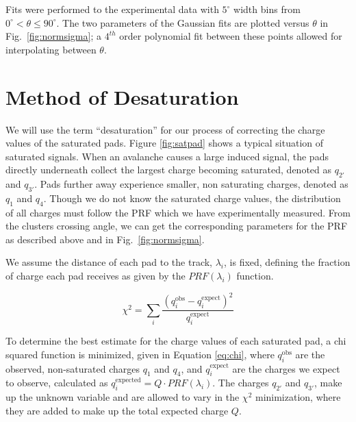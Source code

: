 \documentclass[review]{elsarticle}
\begin{document}
Fits were performed to the experimental data with  $5^{\circ}$ width bins from $0^{\circ} < \theta \leq 90^{\circ}$. The two parameters of the Gaussian fits are plotted versus $\theta$ in Fig.~\ref{fig:normsigma}; a $4^{th}$ order polynomial fit between these points allowed for interpolating between $\theta$.

\section{Method of Desaturation}
We will use the term ``desaturation'' for our process of correcting the charge values of the saturated pads. Figure \ref{fig:satpad} shows a typical situation of saturated signals. When an avalanche causes a large induced signal, the pads directly underneath collect the largest charge becoming saturated, denoted as $q_{2'}$ and $q_{3'}$. Pads further away experience smaller, non saturating charges, denoted as $q_{1}$ and $q_{4}$. Though we do not know the saturated charge values, the distribution of all charges must follow the PRF which we have experimentally measured. From the clusters crossing angle, we can get the corresponding parameters for the PRF as described above and in Fig.~\ref{fig:normsigma}.

We assume the distance of each pad to the track, $\lambda_i$, is fixed, defining the fraction of charge each pad receives as given by the $PRF(\lambda_i)$ function. 


\begin{equation}\label{eq:chi}
\chi^2 = \sum_i \frac{(q_i^{\mathrm{obs}} - q_i^{\mathrm{expect}})^2}{q_i^{\mathrm{expect}}}
\end{equation}

To determine the best estimate for the charge values of each saturated pad, a chi squared function is minimized, given in  Equation \ref{eq:chi}, where $q_i^{\mathrm{obs}}$ are the observed, non-saturated charges $q_{1}$ and $q_{4}$, and $q_i^{\mathrm{expect}}$ are the charges we expect to observe, calculated as $q_i^{\mathrm{expected}} = Q\cdot PRF(\lambda_i)$. The charges $q_{2'}$ and $q_{3'}$, make up the unknown variable and are allowed to vary in the $\chi^2$ minimization, where they are added to make up the total expected charge $Q$.
\end{document}
